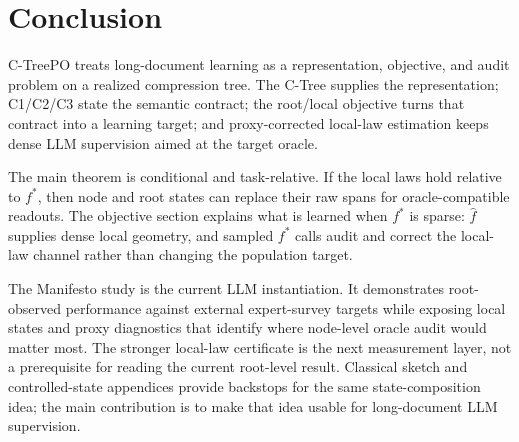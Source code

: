 \section{Conclusion}\label{sec:v8-conclusion}

C-TreePO treats long-document learning as a representation, objective, and
audit problem on a realized compression tree. The C-Tree supplies the
representation; C1/C2/C3 state the semantic contract; the root/local objective
turns that contract into a learning target; and proxy-corrected local-law
estimation keeps dense LLM supervision aimed at the target oracle.

The main theorem is conditional and task-relative. If the local laws hold
relative to \(f^\ast\), then node and root states can replace their raw spans
for oracle-compatible readouts. The objective section explains what is learned
when \(f^\ast\) is sparse: \(\widehat f\) supplies dense local geometry, and
sampled \(f^\ast\) calls audit and correct the local-law channel rather than
changing the population target.

The Manifesto study is the current LLM instantiation. It demonstrates
root-observed performance against external expert-survey targets while exposing
local states and proxy diagnostics that identify where node-level oracle audit
would matter most. The stronger local-law certificate is the next measurement
layer, not a prerequisite for reading the current root-level result. Classical
sketch and controlled-state appendices provide backstops for the same
state-composition idea; the main contribution is to make that idea usable for
long-document LLM supervision.
